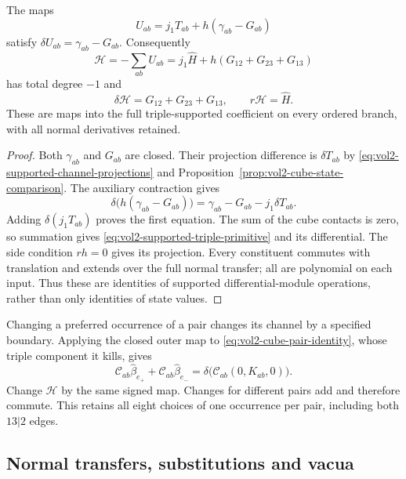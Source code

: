 \begin{theorem}
\label{thm:vol2-supported-triple-homotopy}
The maps
\begin{equation}\label{eq:vol2-supported-comparison-primitive}
 U_{ab}=j_1T_{ab}+h(\gamma_{ab}-G_{ab})
\end{equation}
satisfy $\delta U_{ab}=\gamma_{ab}-G_{ab}$. Consequently
\begin{equation}\label{eq:vol2-supported-triple-primitive}
 \mathcal H=-\sum_{ab}U_{ab}
       =j_1\widehat H+h(G_{12}+G_{23}+G_{13})
\end{equation}
has total degree $-1$ and
\[
 \delta\mathcal H=G_{12}+G_{23}+G_{13},\qquad
 r\mathcal H=\widehat H.
\]
These are maps into the full triple-supported coefficient
on every ordered branch, with all normal derivatives retained.
\end{theorem}

\begin{proof}
Both $\gamma_{ab}$ and $G_{ab}$ are closed. Their projection
difference is $\delta T_{ab}$ by
\eqref{eq:vol2-supported-channel-projections} and
Proposition~\ref{prop:vol2-cube-state-comparison}. The
auxiliary contraction gives
\[
 \delta\bigl(h(\gamma_{ab}-G_{ab})\bigr)
 =\gamma_{ab}-G_{ab}-j_1\delta T_{ab}.
\]
Adding $\delta(j_1T_{ab})$ proves the first equation.
The sum of the cube contacts is zero, so summation gives
\eqref{eq:vol2-supported-triple-primitive} and its differential.
The side condition $rh=0$ gives its projection.
Every constituent commutes with translation and extends over
the full normal transfer; all are polynomial on each input.
Thus these are identities of supported differential-module
operations, rather than only identities of state values.
\end{proof}

Changing a preferred occurrence of a pair changes its channel
by a specified boundary. Applying the closed outer map to
\eqref{eq:vol2-cube-pair-identity}, whose triple component it
kills, gives
\[
 \mathcal C_{ab}\widehat\beta_{e_+}
 +\mathcal C_{ab}\widehat\beta_{e_-}
 =\delta\bigl(\mathcal C_{ab}(0,K_{ab},0)\bigr).
\]
Change $\mathcal H$ by the same signed map. Changes for
different pairs add and therefore commute. This retains all
eight choices of one occurrence per pair, including both
$13|2$ edges.

\subsection{Normal transfers, substitutions and vacua}

